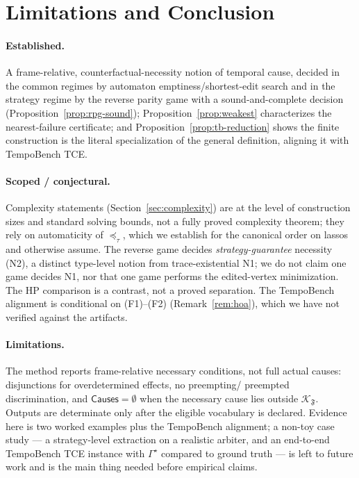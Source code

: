 \documentclass[11pt]{article}
\theoremstyle{remark}
\newcommand{\Frame}{\mathfrak{F}}
\begin{document}
\section{Limitations and Conclusion}
\label{sec:conclusion}

\paragraph{Established.} A frame-relative, counterfactual-necessity notion of
temporal cause, decided in the common regimes by automaton emptiness/shortest-edit
search and in the strategy regime by the reverse parity game with a
sound-and-complete decision (Proposition~\ref{prop:rpg-sound});
Proposition~\ref{prop:weakest} characterizes the nearest-failure certificate; and
Proposition~\ref{prop:tb-reduction} shows the finite construction is the literal
specialization of the general definition, aligning it with TempoBench TCE.

\paragraph{Scoped / conjectural.} Complexity statements (Section~\ref{sec:complexity})
are at the level of construction sizes and standard solving bounds, not a fully
proved complexity theorem; they rely on automaticity of \(\preceq_\tau\), which we
establish for the canonical order on lassos and otherwise assume. The reverse game
decides \emph{strategy-guarantee} necessity (N2), a distinct type-level notion from
trace-existential N1; we do not claim one game decides N1, nor that one game
performs the edited-vertex minimization. The HP comparison is a contrast, not a
proved separation. The TempoBench alignment is conditional on (F1)--(F2)
(Remark~\ref{rem:hoa}), which we have not verified against the artifacts.

\paragraph{Limitations.} The method reports frame-relative necessary conditions,
not full actual causes: disjunctions for overdetermined effects, no preempting/%
preempted discrimination, and \(\mathsf{Causes}=\emptyset\) when the necessary cause
lies outside \(\mathcal{K}_{\Frame}\). Outputs are determinate only after the
eligible vocabulary is declared. Evidence here is two worked examples plus the
TempoBench alignment; a non-toy case study --- a strategy-level extraction on a
realistic arbiter, and an end-to-end TempoBench TCE instance with
\(\Gamma^\star\) compared to ground truth --- is left to future work and is the
main thing needed before empirical claims.
\end{document}
